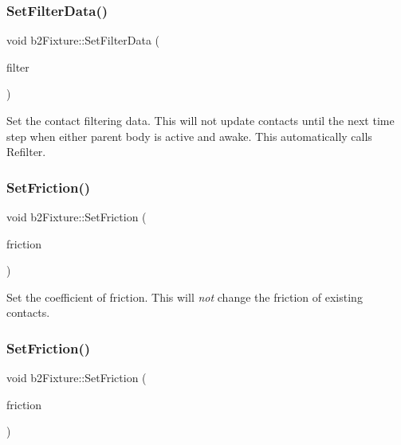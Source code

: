 \subsubsection{\texorpdfstring{Set\+Filter\+Data()}{SetFilterData()}\hspace{0.1cm}{\footnotesize\ttfamily [2/2]}}
{\footnotesize\ttfamily void b2\+Fixture\+::\+Set\+Filter\+Data (\begin{DoxyParamCaption}\item[{const \hyperlink{structb2Filter}{b2\+Filter} \&}]{filter }\end{DoxyParamCaption})}

Set the contact filtering data. This will not update contacts until the next time step when either parent body is active and awake. This automatically calls Refilter. \mbox{\label{classb2Fixture_ad0cd91eef5858c8ef1d6b62cc2a34ea2}} 
\subsubsection{\texorpdfstring{Set\+Friction()}{SetFriction()}\hspace{0.1cm}{\footnotesize\ttfamily [1/2]}}
{\footnotesize\ttfamily void b2\+Fixture\+::\+Set\+Friction (\begin{DoxyParamCaption}\item[{float32}]{friction }\end{DoxyParamCaption})\hspace{0.3cm}{\ttfamily [inline]}}

Set the coefficient of friction. This will {\itshape not} change the friction of existing contacts. \mbox{\label{classb2Fixture_ad0cd91eef5858c8ef1d6b62cc2a34ea2}} 
\subsubsection{\texorpdfstring{Set\+Friction()}{SetFriction()}\hspace{0.1cm}{\footnotesize\ttfamily [2/2]}}
{\footnotesize\ttfamily void b2\+Fixture\+::\+Set\+Friction (\begin{DoxyParamCaption}\item[{float32}]{friction }\end{DoxyParamCaption})}

